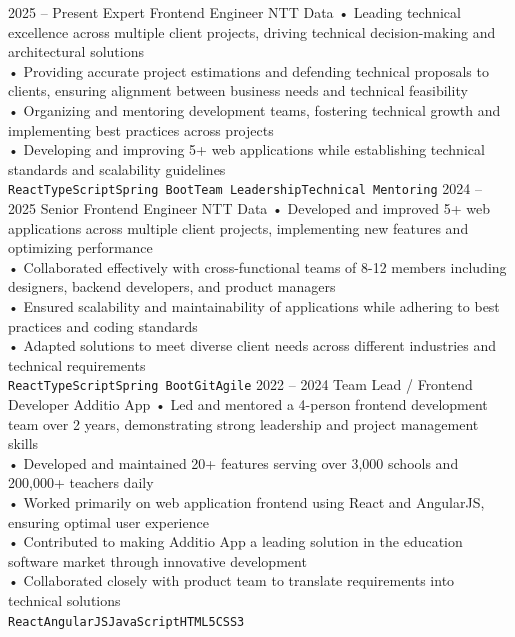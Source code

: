 \documentclass[9pt]{developercv} %
\begin{document}
\begin{entrylist}
	\entry
		{2025 -- Present}
		{Expert Frontend Engineer}
		{NTT Data}
		{• Leading technical excellence across multiple client projects, driving technical decision-making and architectural solutions\\
		• Providing accurate project estimations and defending technical proposals to clients, ensuring alignment between business needs and technical feasibility\\
		• Organizing and mentoring development teams, fostering technical growth and implementing best practices across projects\\
		• Developing and improving 5+ web applications while establishing technical standards and scalability guidelines\\ \texttt{React}\slashsep\texttt{TypeScript}\slashsep\texttt{Spring Boot}\slashsep\texttt{Team Leadership}\slashsep\texttt{Technical Mentoring}}
	\entry
		{2024 -- 2025}
		{Senior Frontend Engineer}
		{NTT Data}
		{• Developed and improved 5+ web applications across multiple client projects, implementing new features and optimizing performance\\
		• Collaborated effectively with cross-functional teams of 8-12 members including designers, backend developers, and product managers\\
		• Ensured scalability and maintainability of applications while adhering to best practices and coding standards\\
		• Adapted solutions to meet diverse client needs across different industries and technical requirements\\ \texttt{React}\slashsep\texttt{TypeScript}\slashsep\texttt{Spring Boot}\slashsep\texttt{Git}\slashsep\texttt{Agile}}
	\entry
		{2022 -- 2024}
		{Team Lead / Frontend Developer}
		{Additio App}
		{• Led and mentored a 4-person frontend development team over 2 years, demonstrating strong leadership and project management skills\\
		• Developed and maintained 20+ features serving over 3,000 schools and 200,000+ teachers daily\\
		• Worked primarily on web application frontend using React and AngularJS, ensuring optimal user experience\\
		• Contributed to making Additio App a leading solution in the education software market through innovative development\\
		• Collaborated closely with product team to translate requirements into technical solutions\\ \texttt{React}\slashsep\texttt{AngularJS}\slashsep\texttt{JavaScript}\slashsep\texttt{HTML5}\slashsep\texttt{CSS3}}

\end{entrylist}
\end{document}
